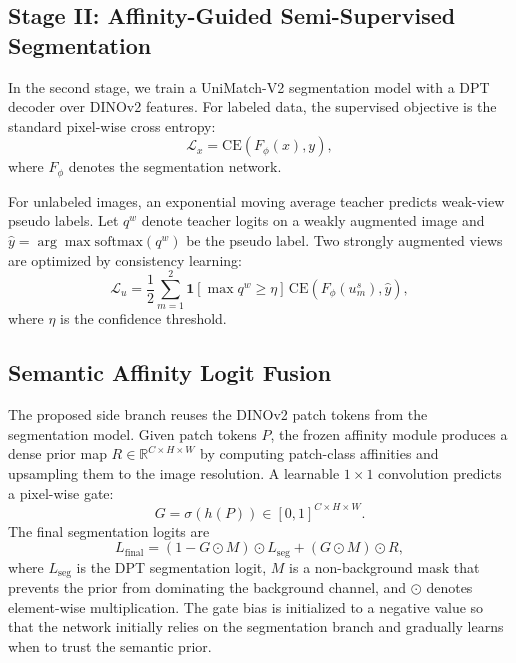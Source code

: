 \documentclass[journal,twoside]{IEEEtran}
\begin{document}
\subsection{Stage II: Affinity-Guided Semi-Supervised Segmentation}
In the second stage, we train a UniMatch-V2 segmentation model with a DPT decoder over DINOv2 features. For labeled data, the supervised objective is the standard pixel-wise cross entropy:
\begin{equation}
    \mathcal{L}_{x} = \mathrm{CE}(F_{\phi}(x), y),
\end{equation}
where $F_{\phi}$ denotes the segmentation network.

For unlabeled images, an exponential moving average teacher predicts weak-view pseudo labels. Let $q^w$ denote teacher logits on a weakly augmented image and $\hat{y}=\arg\max \mathrm{softmax}(q^w)$ be the pseudo label. Two strongly augmented views are optimized by consistency learning:
\begin{equation}
    \mathcal{L}_{u} =
    \frac{1}{2}\sum_{m=1}^{2}
    \mathbf{1}[\max q^w \ge \eta]\,
    \mathrm{CE}(F_{\phi}(u_m^s), \hat{y}),
\end{equation}
where $\eta$ is the confidence threshold.

\subsection{Semantic Affinity Logit Fusion}
The proposed side branch reuses the DINOv2 patch tokens from the segmentation model. Given patch tokens $P$, the frozen affinity module produces a dense prior map $R \in \mathbb{R}^{C \times H \times W}$ by computing patch-class affinities and upsampling them to the image resolution. A learnable $1\times1$ convolution predicts a pixel-wise gate:
\begin{equation}
    G = \sigma(h(P)) \in [0,1]^{C \times H \times W}.
\end{equation}
The final segmentation logits are
\begin{equation}
    L_{\mathrm{final}} =
    (1-G \odot M) \odot L_{\mathrm{seg}}
    + (G \odot M) \odot R,
\end{equation}
where $L_{\mathrm{seg}}$ is the DPT segmentation logit, $M$ is a non-background mask that prevents the prior from dominating the background channel, and $\odot$ denotes element-wise multiplication. The gate bias is initialized to a negative value so that the network initially relies on the segmentation branch and gradually learns when to trust the semantic prior.
\end{document}
